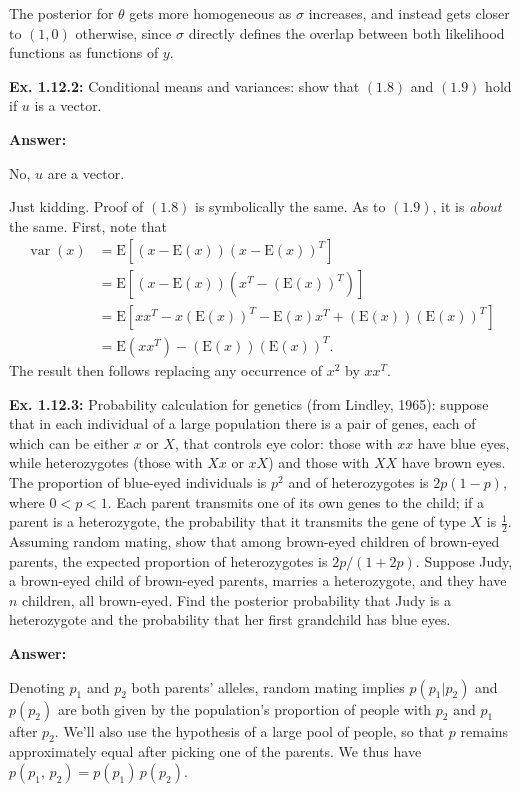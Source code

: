 \documentclass{article}
\newcommand\oname\operatorname
\begin{document}
The posterior for $\theta$ gets more homogeneous as $\sigma$ increases, and instead gets closer to $(1, 0)$ otherwise, since $\sigma$ directly defines the overlap between both likelihood functions as functions of $y$.

\textbf{Ex. 1.12.2: }Conditional means and variances: show that $(1.8)$ and $(1.9)$ hold if $u$ is a vector.

\textbf{Answer:}

No, $u$ are a vector.

Just kidding. Proof of $(1.8)$ is symbolically the same. As to $(1.9)$, it is \textit{about} the same. First, note that
\begin{align*}
	\oname{var}(x)&=\mathrm E\left[\left(x-\mathrm E(x)\right)\left(x-\mathrm E(x)\right)^T\right]\\
	&=\mathrm E\left[\left(x-\mathrm E(x)\right)\left(x^T-\left(\mathrm E(x)\right)^T\right)\right]\\
	&=\mathrm E\left[xx^T-x\left(\mathrm E(x)\right)^T-\mathrm E(x)x^T+\left(\mathrm E(x)\right)\left(\mathrm E(x)\right)^T\right]\\
	&=\mathrm E\left(xx^T\right)-\left(\mathrm E(x)\right)\left(\mathrm E(x)\right)^T.
\end{align*}
The result then follows replacing any occurrence of $x^2$ by $xx^T$.

\textbf{Ex. 1.12.3: }Probability calculation for genetics (from Lindley, 1965): suppose that in each individual of a large population there is a pair of genes, each of which can be either $x$ or $X$, that controls eye color: those with $xx$ have blue eyes, while heterozygotes (those with $Xx$ or $xX$) and those with $XX$ have brown eyes. The proportion of blue-eyed individuals is $p^2$ and of heterozygotes is $2p(1-p)$, where $0<p<1$. Each parent transmits one of its own genes to the child; if a parent is a heterozygote, the probability that it transmits the gene of type $X$ is $\frac12$. Assuming random mating, show that among brown-eyed children of brown-eyed parents, the expected proportion of heterozygotes is $2p/(1+2p)$. Suppose Judy, a brown-eyed child of brown-eyed parents, marries a heterozygote, and they have $n$ children, all brown-eyed. Find the posterior probability that Judy is a heterozygote and the probability that her first grandchild has blue eyes.

\textbf{Answer:}

Denoting $p_1$ and $p_2$ both parents' alleles, random mating implies $p(p_1|p_2)$ and $p(p_2)$ are both given by the population's proportion of people with $p_2$ and $p_1$ after $p_2$. We'll also use the hypothesis of a large pool of people, so that $p$ remains approximately equal after picking one of the parents. We thus have $p(p_1,\,p_2)=p(p_1)\,p(p_2)$.
\end{document}
